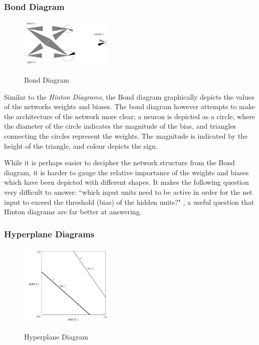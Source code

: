 \documentclass[a4paper,11pt,titlepage]{article}
\begin{document}
\subsubsection{Bond Diagram}		
 	\begin{figure}[H]
    			\centering	
			{{\includegraphics[width=0.4\textwidth]
    				{img/craven_bond.png} 
    			}}%
    			\caption{Bond Diagram}%
    		\label{fig:bond}
	\end{figure} 
 		
		Similar to the \textit{Hinton Diagrams}, the Bond diagram \cite{Wejchert1990} graphically depicts the values of the networks weights and biases. The bond diagram however attempts to make the architecture of the network more clear; a neuron is depicted as a circle, where the diameter of the circle indicates the magnitude of the bias, and triangles connecting the circles represent the weights. The magnitude is indicated by the height of the triangle, and colour depicts the sign. 
		\par 
		While it is perhaps easier to decipher the network structure from the Bond diagram, it is harder to gauge the relative importance of the weights and biases which have been depicted with different shapes. It makes the following question very difficult to answer: ``which input units need to be active in order for the net input to exceed the threshold (bias) of the hidden units?" \cite{Craven1992}, a useful question that Hinton diagrams are far better at answering.
		\par 
		
\subsubsection{Hyperplane Diagrams}
		
 	\begin{figure}[H]
    			\centering	
			{{\includegraphics[width=0.4\textwidth]
    				{img/craven_hyperplane.png} 
    			}}%
    			\caption{Hyperplane Diagram}%
    		\label{fig:bond}
	\end{figure} 
 		
\end{document}
